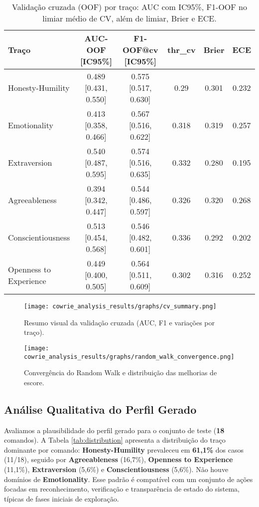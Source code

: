 \documentclass[12pt]{article}
\begin{document}
\begin{table}[H]
\centering
\caption{Validação cruzada (OOF) por traço: AUC com IC95\%, F1-OOF no limiar médio de CV, além de limiar, Brier e ECE.}
\label{tab:oof}
\begin{tabular}{lccccc}
\hline
Traço & AUC-OOF [IC95\%] & F1-OOF@cv [IC95\%] & thr\_cv & Brier & ECE \\
\hline
Honesty-Humility & 0.489 [0.431, 0.550] & 0.575 [0.517, 0.630] & 0.29 & 0.301 & 0.232 \\
Emotionality & 0.413 [0.358, 0.466] & 0.567 [0.516, 0.622] & 0.318 & 0.319 & 0.257 \\
Extraversion & 0.540 [0.487, 0.595] & 0.574 [0.516, 0.635] & 0.332 & 0.280 & 0.195 \\
Agreeableness & 0.394 [0.342, 0.447] & 0.544 [0.486, 0.597] & 0.326 & 0.320 & 0.268 \\
Conscientiousness & 0.513 [0.454, 0.568] & 0.546 [0.482, 0.601] & 0.336 & 0.292 & 0.202 \\
Openness to Experience & 0.449 [0.400, 0.505] & 0.564 [0.511, 0.609] & 0.302 & 0.316 & 0.252 \\
\hline
\end{tabular}
\end{table}

\begin{figure}[H]
\centering
\texttt{[image: cowrie\_analysis\_results/graphs/cv\_summary.png]}
\caption{Resumo visual da validação cruzada (AUC, F1 e variações por traço).}
\label{fig:cvsummary}
\end{figure}

\begin{figure}[H]
\centering
\texttt{[image: cowrie\_analysis\_results/graphs/random\_walk\_convergence.png]}
\caption{Convergência do Random Walk e distribuição das melhorias de escore.}
\label{fig:rw}
\end{figure}

\subsection{Análise Qualitativa do Perfil Gerado}

Avaliamos a plausibilidade do perfil gerado para o conjunto de teste (\textbf{18} comandos). A Tabela \ref{tab:distribution} apresenta a distribuição do traço dominante por comando: \textbf{Honesty-Humility} prevaleceu em \textbf{61,1\%} dos casos (11/18), seguido por \textbf{Agreeableness} (16,7\%), \textbf{Openness to Experience} (11,1\%), \textbf{Extraversion} (5,6\%) e \textbf{Conscientiousness} (5,6\%). Não houve domínios de \textbf{Emotionality}. Esse padrão é compatível com um conjunto de ações focadas em reconhecimento, verificação e transparência de estado do sistema, típicas de fases iniciais de exploração.
\end{document}
